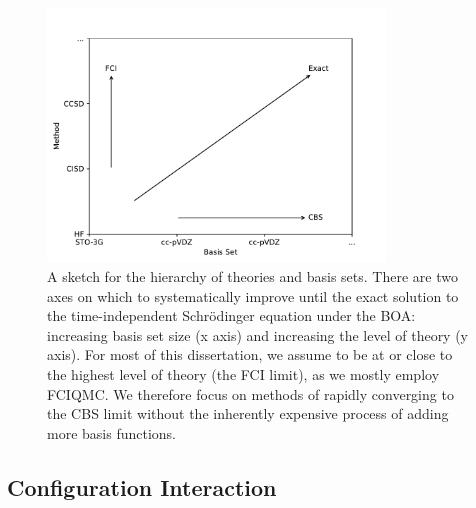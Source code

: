 \begin{figure}[htbp]
    \centering
    \includegraphics[width=0.8\textwidth]{figures/intro/hierarchies.pdf}
    \caption{A sketch for the hierarchy of theories and basis sets. There are two axes on which to systematically improve until the exact solution to the time-independent Schr\"odinger equation under the \gls{BOA}: increasing basis set size (x axis) and increasing the level of theory (y axis). For most of this dissertation, we assume to be at or close to the highest level of theory (the FCI limit), as we mostly employ \gls{FCIQMC}. We therefore focus on methods of rapidly converging to the \gls{CBS} limit without the inherently expensive process of adding more basis functions.}
    \label{fig:hierarchies}
\end{figure}



\subsection{Configuration Interaction}
\label{sec:ci}

